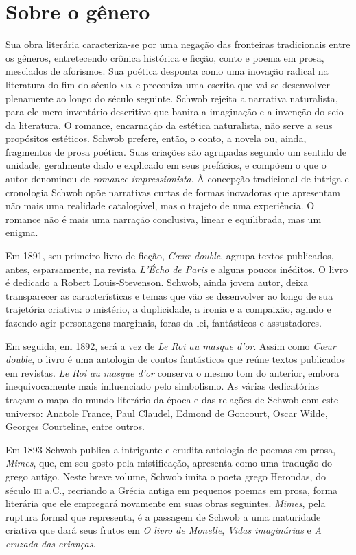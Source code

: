 \section{Sobre o gênero}

Sua obra literária caracteriza-se por uma negação das fronteiras
tradicionais entre os gêneros, entretecendo crônica histórica e ficção, conto e
poema em prosa, mesclados de aforismos. Sua poética desponta como uma inovação
radical na literatura do fim do século \textsc{xix} e preconiza uma escrita que vai se
desenvolver plenamente ao longo do século seguinte. Schwob rejeita a narrativa
naturalista, para ele mero inventário descritivo que banira a imaginação e a
invenção do seio da literatura. O romance, encarnação da estética naturalista,
não serve a seus propósitos estéticos. Schwob prefere, então, o conto, a novela
ou, ainda, fragmentos de prosa poética. Suas criações são agrupadas segundo um
sentido de unidade, geralmente dado e explicado em seus prefácios, e compõem o
que o autor denominou de \textit{romance impressionista}. À concepção
tradicional de intriga e cronologia Schwob opõe narrativas curtas de formas
inovadoras que apresentam não mais uma realidade catalogável, mas o trajeto de
uma experiência. O romance não é mais uma narração conclusiva, linear e
equilibrada, mas um enigma.

Em 1891, seu primeiro livro de ficção, \textit{C\oe ur double}, agrupa textos
publicados, antes, esparsamente, na revista \textit{L’Écho}\textit{ de Paris} e
alguns poucos inéditos. O livro é dedicado a Robert Louis-Stevenson. Schwob,
ainda jovem autor, deixa transparecer as características e temas que vão se
desenvolver ao longo de sua trajetória criativa: o mistério, a duplicidade, a
ironia e a compaixão, agindo e fazendo agir personagens marginais, foras da
lei, fantásticos e assustadores.

Em seguida, em 1892, será a vez de \textit{Le Roi au masque d’or}. Assim
como \textit{C\oe ur double}, o livro é uma antologia de contos fantásticos que
reúne textos publicados em revistas. \textit{Le Roi
au masque d’or} conserva o mesmo tom do anterior, embora inequivocamente mais
influenciado pelo simbolismo. As várias dedicatórias traçam o mapa do mundo
literário da época e das relações de Schwob com este universo: Anatole France,
Paul Claudel, Edmond de Goncourt, Oscar Wilde, Georges Courteline, entre outros.

Em 1893 Schwob publica a intrigante e erudita antologia de poemas em prosa,
\textit{Mimes}, que, em seu gosto pela mistificação, apresenta como uma
tradução do grego antigo. Neste breve volume, Schwob imita o poeta grego
Herondas, do século \textsc{iii} a.C., recriando a Grécia antiga em pequenos poemas em
prosa, forma literária que ele empregará novamente em suas obras seguintes.
\textit{Mimes}, pela ruptura formal que representa, é a passagem de Schwob a uma 
maturidade criativa que
dará seus frutos em \textit{O livro de Monelle}, \textit{Vidas imaginárias} e 
\textit{A cruzada das crianças}.

